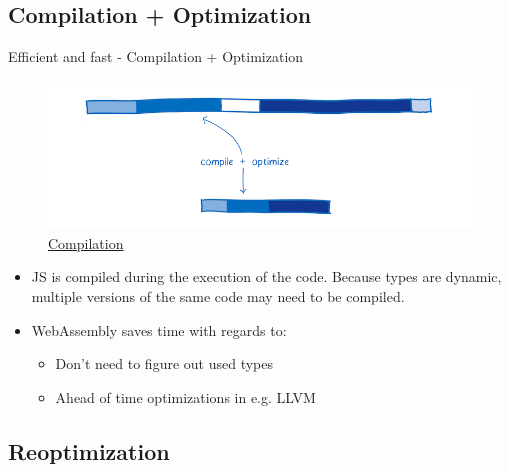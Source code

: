 \documentclass{beamer}
\begin{document}
\subsection{Compilation + Optimization}

\begin{frame}{Efficient and fast - Compilation + Optimization}
    \begin{figure}
        \includegraphics[scale=0.2]{./images/copyoptimize.png}
        \caption{\href{https://www.smashingmagazine.com/2017/05/abridged-cartoon-introduction-webassembly/}{Compilation}}
    \end{figure}
    \begin{itemize}
        \item JS is compiled during the execution of the code. Because types are dynamic, multiple versions of the same code may need to be compiled.
        \item WebAssembly saves time with regards to:
              \begin{itemize}
                  \item Don't need to figure out used types
                  \item Ahead of time optimizations in e.g. LLVM
              \end{itemize}
    \end{itemize}
\end{frame}

\subsection{Reoptimization}
\end{document}
